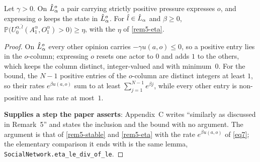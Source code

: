 \begin{lemma}
  \label{aux-biased-rem5}
  \leanok
  Let $\gamma > 0$.  On $\hat{L}_\alpha^o$ a pair carrying strictly positive
  pressure expresses $o$, and expressing $o$ keeps the state in
  $\hat{L}_\alpha^o$.  For $\hat{l} \in \hat{L}_\alpha$ and $\beta \ge 0$,
  $\mathbb{P}\bigl(U^{\alpha,\hat{l}}_0(A^\alpha_1, O^\alpha_1) > 0\bigr) \ge
  \eta$, with the $\eta$ of \ref{rem5-eta}.
\end{lemma}
\begin{proof}
  \leanok
  On $\hat{L}_\alpha^o$ every other opinion carries $-\gamma u(a,o) \le 0$, so a
  positive entry lies in the $o$-column; expressing $o$ resets one actor to $0$
  and adds $1$ to the others, which keeps the column distinct, integer-valued
  and with minimum~$0$.  For the bound, the $N-1$ positive entries of the
  $o$-column are distinct integers at least $1$, so their rates $e^{\beta
  u(a,o)}$ sum to at least $\sum_{j=1}^{N-1} e^{\beta j}$, while every other
  entry is non-positive and has rate at most~$1$.

  \textbf{Supplies a step the paper asserts}: Appendix~C writes ``similarly as
  discussed in Remark~5'' and states the inclusion and the bound with no
  argument.  The argument is that of \ref{rem5-stable} and \ref{rem5-eta} with
  the rate $e^{\beta u(a,o)}$ of \ref{eq7}; the elementary comparison it ends
  with is the same lemma, \texttt{SocialNetwork.eta\_le\_div\_of\_le}.
\end{proof}

